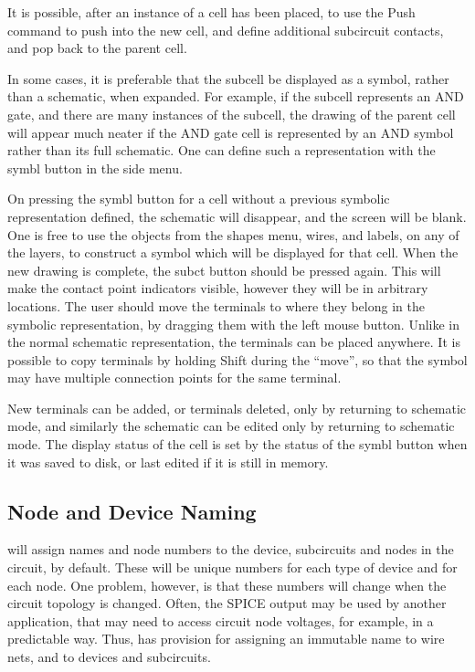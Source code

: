 It is possible, after an instance of a cell has been placed, to use
the {\cb Push} command to push into the new cell, and define
additional subcircuit contacts, and pop back to the parent cell.

In some cases, it is preferable that the subcell be displayed as a
symbol, rather than a schematic, when expanded.  For example, if the
subcell represents an AND gate, and there are many instances of the
subcell, the drawing of the parent cell will appear much neater if the
AND gate cell is represented by an AND symbol rather than  its full
schematic.  One can define such a representation with the {\cb symbl}
button in the side menu.

On pressing the {\cb symbl} button for a cell without a previous
symbolic representation defined, the schematic will disappear, and the
screen will be blank.  One is free to use the objects from the {\cb
shapes} menu, wires, and labels, on any of the layers, to construct a
symbol which will be displayed for that cell.  When the new drawing is
complete, the {\cb subct} button should be pressed again.  This will
make the contact point indicators visible, however they will be in
arbitrary locations.  The user should move the terminals to where they
belong in the symbolic representation, by dragging them with the left
mouse button.  Unlike in the normal schematic representation, the
terminals can be placed anywhere.  It is possible to copy terminals by
holding {\kb Shift} during the ``move'', so that the symbol may have
multiple connection points for the same terminal.

New terminals can be added, or terminals deleted, only by returning to
schematic mode, and similarly the schematic can be edited only by
returning to schematic mode.  The display status of the cell is set by
the status of the {\cb symbl} button when it was saved to disk, or
last edited if it is still in memory.

\subsection{Node and Device Naming}

{\Xic} will assign names and node numbers to the device, subcircuits
and nodes in the circuit, by default.  These will be unique numbers
for each type of device and for each node.  One problem, however, is
that these numbers will change when the circuit topology is changed. 
Often, the SPICE output may be used by another application, that may
need to access circuit node voltages, for example, in a predictable
way.  Thus, {\Xic} has provision for assigning an immutable name to
wire nets, and to devices and subcircuits.

